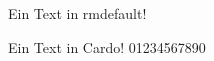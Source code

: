 \documentclass{article}
\begin{document}
\huge

Ein Text in rmdefault!

\bigskip
{\sffamily
Ein Text in Cardo!  01234567890}
\end{document}
